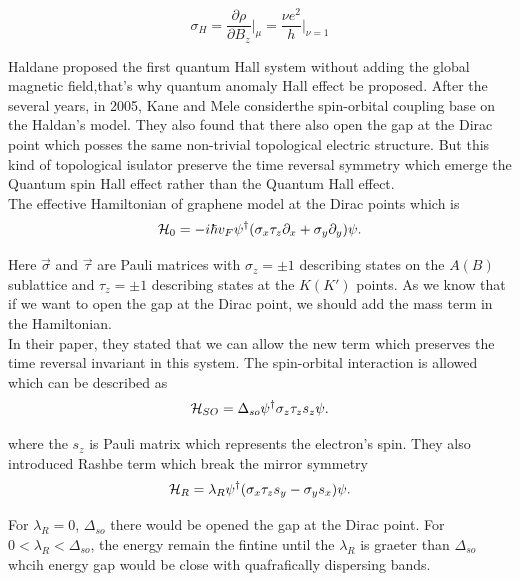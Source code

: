 \documentclass[12pt,a4paper]{article}
\begin{document}
\begin{equation*}
  \sigma_{H} = \frac{\partial \rho}{\partial B_{z}} \bigg\rvert_{\mu} =
  \frac{\nu e^{2}}{h} \bigg\rvert_{\nu = 1} 
\end{equation*}

\noindent
Haldane proposed the first quantum Hall system without adding the
global magnetic field,that's why quantum anomaly Hall effect be proposed. 
After the several years, in 2005, Kane and Mele considerthe spin-orbital 
coupling base on the Haldan's model. They also found that there also open
the gap at the Dirac point which posses the same non-trivial topological
electric structure. But this kind of topological isulator preserve the time
reversal symmetry which emerge the Quantum spin Hall effect rather than the
Quantum Hall effect.\\ 

The effective Hamiltonian of graphene model at the Dirac points which is\\
\begin{equation*}
{\cal H}_0 = -i\hbar v_F \psi^\dagger(\sigma_x\tau_z\partial_x +
\sigma_y\partial_y)\psi.
\end{equation*}

\noindent
Here $\vec\sigma$ and $\vec\tau$ are Pauli matrices with
$\sigma_z = \pm 1$ describing states on the $A(B)$ sublattice and
$\tau_z = \pm 1$ describing states at the $K(K')$ points. As we know that
if we want to open the gap at the Dirac point, we should add the mass term
in the Hamiltonian.\\ 

In their paper, they stated that we can allow the new term which preserves
the time reversal invariant in this system. The spin-orbital interaction is
allowed which can be described as
\begin{equation*}
{\cal H}_{SO} = \Delta_{so} \psi^\dagger \sigma_z\tau_z s_z \psi.
\end{equation*}

\noindent
where the $s_z$ is Pauli matrix which represents the electron's spin. They
also introduced Rashbe term which break the mirror symmetry
\begin{equation*}
{\cal H}_R = \lambda_R \psi^\dagger (\sigma_x\tau_z s_y - \sigma_y
s_x)\psi.
\end{equation*}

\noindent
For $\lambda_R = 0$, $\Delta_{so}$ there would be opened the gap at the
Dirac point. For $0<\lambda_R<\Delta_{so}$, the energy remain the fintine
until the $\lambda_R$ is graeter than $\Delta_{so}$ whcih energy gap would
be close with quafrafically dispersing bands.\\
\end{document}
